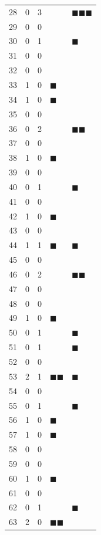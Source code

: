 \documentclass[12pt,a4paper]{abntex2}
\begin{document}
\begin{longtable}{|c|c|c|l|l|}
28 & 0 & 3 &   & $\blacksquare\blacksquare\blacksquare$ \\
29 & 0 & 0 &   & \\
30 & 0 & 1 &   & $\blacksquare$ \\
31 & 0 & 0 &   & \\
32 & 0 & 0 &   & \\
33 & 1 & 0 & $\blacksquare$ & \\
34 & 1 & 0 & $\blacksquare$ & \\
35 & 0 & 0 &   & \\
36 & 0 & 2 &   & $\blacksquare\blacksquare$ \\
37 & 0 & 0 &   & \\
38 & 1 & 0 & $\blacksquare$ & \\
39 & 0 & 0 &   & \\
40 & 0 & 1 &   & $\blacksquare$ \\
41 & 0 & 0 &   & \\
42 & 1 & 0 & $\blacksquare$ & \\
43 & 0 & 0 &   & \\
44 & 1 & 1 & $\blacksquare$ & $\blacksquare$ \\
45 & 0 & 0 &   & \\
46 & 0 & 2 &   & $\blacksquare\blacksquare$ \\
47 & 0 & 0 &   & \\
48 & 0 & 0 &   & \\
49 & 1 & 0 & $\blacksquare$ & \\
50 & 0 & 1 &   & $\blacksquare$ \\
51 & 0 & 1 &   & $\blacksquare$ \\
52 & 0 & 0 &   & \\
53 & 2 & 1 & $\blacksquare\blacksquare$ & $\blacksquare$ \\
54 & 0 & 0 &   & \\
55 & 0 & 1 &   & $\blacksquare$ \\
56 & 1 & 0 & $\blacksquare$ & \\
57 & 1 & 0 & $\blacksquare$ & \\
58 & 0 & 0 &   & \\
59 & 0 & 0 &   & \\
60 & 1 & 0 & $\blacksquare$ & \\
61 & 0 & 0 &   & \\
62 & 0 & 1 &   & $\blacksquare$ \\
63 & 2 & 0 & $\blacksquare\blacksquare$ & \\

\hline
\end{longtable}
\end{document}
